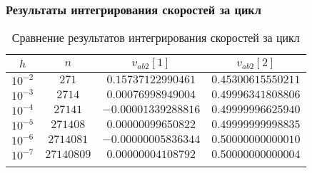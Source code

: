 \begin{frame}
\frametitle{Результаты интегрирования скоростей за цикл}

\begin{table}[h]
  \centering
  \caption{Сравнение результатов интегрирования скоростей за цикл}
  \begin{tabular}{cccc}
    \toprule
    $ h $ &
    $ n $ &
    $ v_{ab2}[1] $ &
    $ v_{ab2}[2] $ \\
    \midrule
    $ 10^{-2} $ & $ 271 $ & $ 0.15737122990461 $ & $ 0.45300615550211 $ \\
    \arrayrulecolor{black!40}
    \midrule
    $ 10^{-3} $ & $ 2714 $ & $ 0.00076998949004 $ & $ 0.49996341808806 $ \\
    \midrule
    $ 10^{-4} $ & $ 27141 $ & $ -0.00001339288816 $ & $ 0.49999996625940 $ \\
    \midrule
    $ 10^{-5} $ & $ 271408 $ & $ 0.00000099650822 $ & $ 0.49999999998835 $ \\
    \midrule
    $ 10^{-6} $ & $ 2714081 $ & $ -0.00000005836344 $ & $ 0.50000000000010 $ \\
    \midrule
    $ 10^{-7} $ & $ 27140809 $ & $ 0.00000004108792 $ & $ 0.50000000000004 $ \\
    \arrayrulecolor{black}
    \bottomrule
  \end{tabular}
\end{table}

\end{frame}

